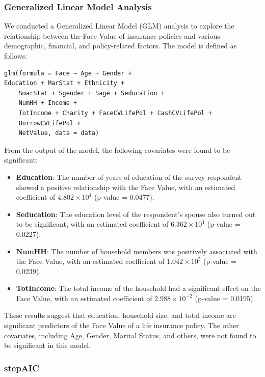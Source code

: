 \documentclass[12pt, twoside,hidelinks]{article}
\theoremstyle{definition}
\numberwithin{equation}{section}
\begin{document}
\subsubsection{Generalized Linear Model Analysis}
We conducted a Generalized Linear Model (GLM) analysis to explore the relationship between the Face Value of insurance policies and various demographic, financial, and policy-related factors. The model is defined as follows:

\begin{verbatim}
glm(formula = Face ~ Age + Gender +
Education + MarStat + Ethnicity + 
    SmarStat + Sgender + Sage + Seducation + 
    NumHH + Income + 
    TotIncome + Charity + FaceCVLifePol + CashCVLifePol + 
    BorrowCVLifePol + 
    NetValue, data = data)
\end{verbatim}

From the output of the model, the following covariates were found to be significant:

\begin{itemize}
    \item \textbf{Education}: The number of years of education of the survey respondent showed a positive relationship with the Face Value, with an estimated coefficient of \(4.802 \times 10^4\) (p-value = 0.0477).
    \item \textbf{Seducation}: The education level of the respondent's spouse also turned out to be significant, with an estimated coefficient of \(6.362 \times 10^4\) (p-value = 0.0227).
    \item \textbf{NumHH}: The number of household members was positively associated with the Face Value, with an estimated coefficient of \(1.042 \times 10^5\) (p-value = 0.0239).
    \item \textbf{TotIncome}: The total income of the household had a significant effect on the Face Value, with an estimated coefficient of \(2.988 \times 10^{-2}\) (p-value = 0.0195).
\end{itemize}

These results suggest that education, household size, and total income are significant predictors of the Face Value of a life insurance policy. The other covariates, including Age, Gender, Marital Status, and others, were not found to be significant in this model. 

\subsubsection*{stepAIC}
\end{document}
